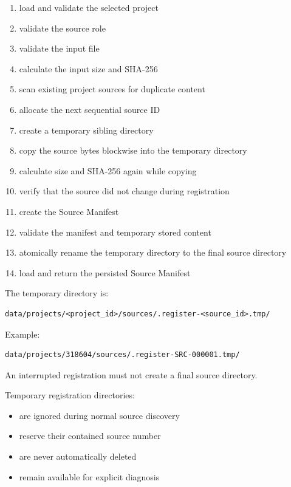 \begin{enumerate}
\def\labelenumi{\arabic{enumi}.}
\tightlist
\item
  load and validate the selected project
\item
  validate the source role
\item
  validate the input file
\item
  calculate the input size and SHA-256
\item
  scan existing project sources for duplicate content
\item
  allocate the next sequential source ID
\item
  create a temporary sibling directory
\item
  copy the source bytes blockwise into the temporary directory
\item
  calculate size and SHA-256 again while copying
\item
  verify that the source did not change during registration
\item
  create the Source Manifest
\item
  validate the manifest and temporary stored content
\item
  atomically rename the temporary directory to the final source directory
\item
  load and return the persisted Source Manifest
\end{enumerate}

The temporary directory is:

\begin{verbatim}
data/projects/<project_id>/sources/.register-<source_id>.tmp/
\end{verbatim}

Example:

\begin{verbatim}
data/projects/318604/sources/.register-SRC-000001.tmp/
\end{verbatim}

An interrupted registration must not create a final source directory.

Temporary registration directories:

\begin{itemize}
\tightlist
\item
  are ignored during normal source discovery
\item
  reserve their contained source number
\item
  are never automatically deleted
\item
  remain available for explicit diagnosis
\end{itemize}


